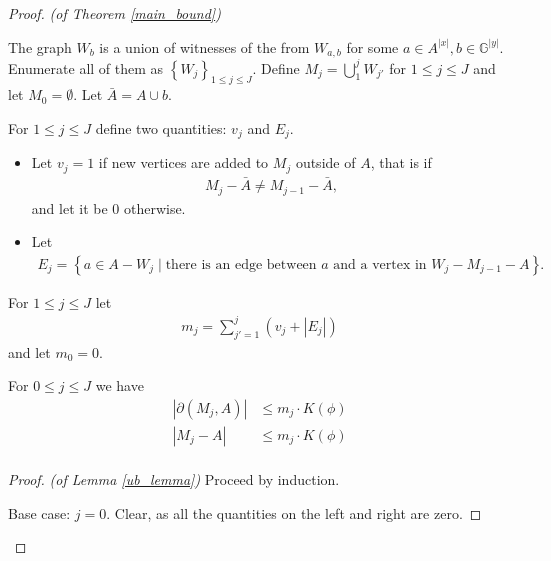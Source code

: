 \documentclass{amsart}
\newcommand{\GG}{\mathbb G}
\newcommand{\GGY}{\GG^{|y|}}
\newcommand{\AX}{A^{|x|}}
\newcommand{\BA}{\bar A}
\newcommand{\curly}[1]{\left\{#1\right\}}
\newcommand{\abs}[1]{\left|#1\right|}
\begin{document}
\begin{proof} \textit{(of Theorem \ref{main_bound})}

  The graph $W_b$ is a union of witnesses of the from $W_{a,b}$ for some $a \in \AX, b \in \GGY$.
  Enumerate all of them as $\curly{W_j}_{1 \leq j \leq J}$.
  Define $M_j = \bigcup_1^j W_{j'}$ for $1 \leq j \leq J$ and let $M_0 = \emptyset$.
  Let $\BA = A \cup b$.
    
  \begin{Definition}
    For $1 \leq j \leq J$ define two quantities: $v_j$ and $E_j$.
    \begin{itemize}
    \item Let $v_j = 1$ if new vertices are added to $M_j$ outside of $A$, that is if
      \begin{align*}
        M_j - \BA \neq M_{j-1} - \BA,
      \end{align*}
      and let it be $0$ otherwise.
    \item Let %
      \begin{align*}
        E_j = \curly{a \in A - W_j \mid \text{there is an edge between $a$ and a vertex in $W_j - M_{j-1} - A$}}.
      \end{align*}
    \end{itemize}
  \end{Definition}

  \begin{Definition}
    For $1 \leq j \leq J$ let
    \begin{align*}
      m_j = \sum_{j ' = 1}^j (v_j + |E_j|) 
    \end{align*}
    and let $m_0 = 0$.
  \end{Definition}

  \begin{Lemma} \label{ub_lemma}
    For $0 \leq j \leq J$ we have
    \begin{align*}
      |\partial(M_j, A)| &\leq m_j \cdot K(\phi) \\
      |M_j - A| &\leq m_j \cdot K(\phi) \\
    \end{align*}
  \end{Lemma}

  \begin{proof} \textit{(of Lemma \ref{ub_lemma})}
    Proceed by induction.

    Base case: $j = 0$. Clear, as all the quantities on the left and right are zero.


\end{proof}
\end{proof}
\end{document}
